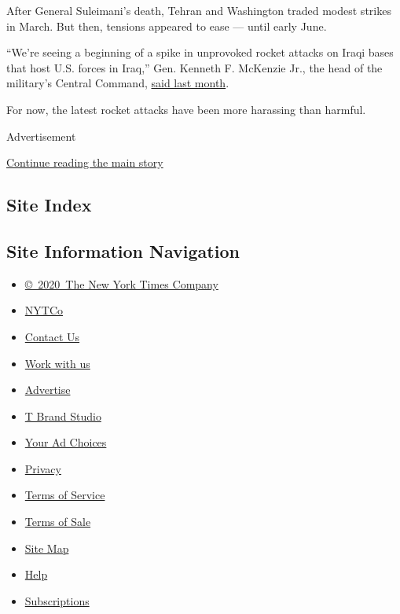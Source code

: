 After General Suleimani's death, Tehran and Washington traded modest
strikes in March. But then, tensions appeared to ease --- until early
June.

``We're seeing a beginning of a spike in unprovoked rocket attacks on
Iraqi bases that host U.S. forces in Iraq,'' Gen. Kenneth F. McKenzie
Jr., the head of the military's Central Command,
\href{https://www.centcom.mil/MEDIA/Transcripts/Article/2226655/gen-mckenzie-interview-transcript-aspen-security-forum-june-18-2020/}{said
last month}.

For now, the latest rocket attacks have been more harassing than
harmful.

Advertisement

\protect\hyperlink{after-bottom}{Continue reading the main story}

\hypertarget{site-index}{%
\subsection{Site Index}\label{site-index}}

\hypertarget{site-information-navigation}{%
\subsection{Site Information
Navigation}\label{site-information-navigation}}

\begin{itemize}
\tightlist
\item
  \href{https://help.nytimes.com/hc/en-us/articles/115014792127-Copyright-notice}{©~2020~The
  New York Times Company}
\end{itemize}

\begin{itemize}
\tightlist
\item
  \href{https://www.nytco.com/}{NYTCo}
\item
  \href{https://help.nytimes.com/hc/en-us/articles/115015385887-Contact-Us}{Contact
  Us}
\item
  \href{https://www.nytco.com/careers/}{Work with us}
\item
  \href{https://nytmediakit.com/}{Advertise}
\item
  \href{http://www.tbrandstudio.com/}{T Brand Studio}
\item
  \href{https://www.nytimes.com/privacy/cookie-policy\#how-do-i-manage-trackers}{Your
  Ad Choices}
\item
  \href{https://www.nytimes.com/privacy}{Privacy}
\item
  \href{https://help.nytimes.com/hc/en-us/articles/115014893428-Terms-of-service}{Terms
  of Service}
\item
  \href{https://help.nytimes.com/hc/en-us/articles/115014893968-Terms-of-sale}{Terms
  of Sale}
\item
  \href{https://spiderbites.nytimes.com}{Site Map}
\item
  \href{https://help.nytimes.com/hc/en-us}{Help}
\item
  \href{https://www.nytimes.com/subscription?campaignId=37WXW}{Subscriptions}
\end{itemize}
